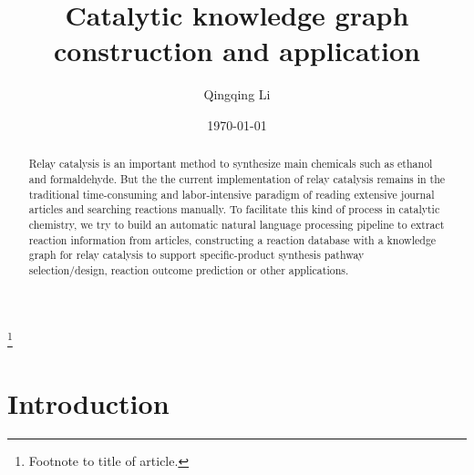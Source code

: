 \documentclass[%
 aip,
 jmp,%
 amsmath,amssymb,
 reprint,%
]{revtex4-2}
\begin{document}

\title[Catalytic knowledge graph construction and application]{Catalytic knowledge graph construction and application}%
\thanks{Footnote to title of article.}

\author{Qingqing Li}

\date{\today}%

\begin{abstract}
Relay catalysis is an important method to synthesize main chemicals such as ethanol and formaldehyde. But the 
the current implementation of relay catalysis remains in the traditional time-consuming 
and labor-intensive paradigm of reading extensive journal articles and searching reactions manually. 
To facilitate this kind of process in catalytic chemistry, we try to build an automatic natural 
language processing pipeline to extract reaction information from articles, constructing a reaction 
database with a knowledge graph for relay catalysis to support specific-product 
synthesis pathway selection/design, reaction outcome prediction or other applications.


%
\end{abstract}

\maketitle



\section{Introduction}
\end{document}
